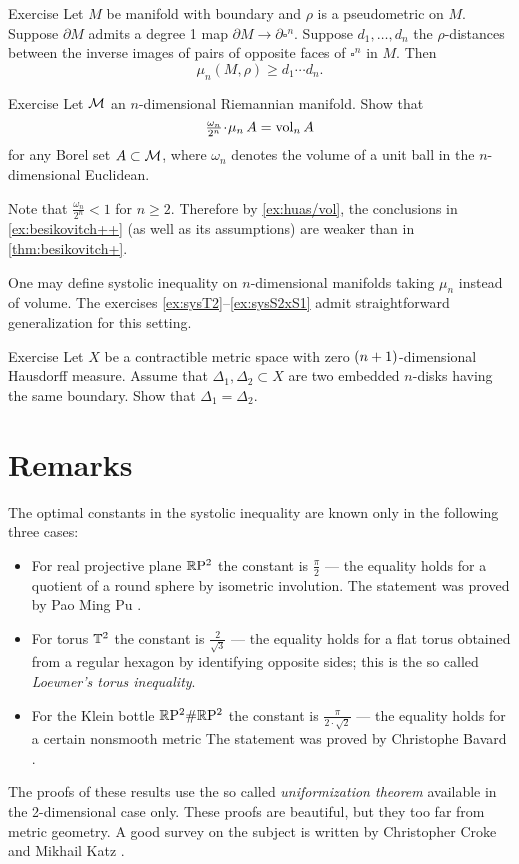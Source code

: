 \begin{thm}{Exercise}\label{ex:besikovitch++}
Let $M$ be manifold with boundary and $\rho$ is a pseudometric on $M$.
Suppose $\partial M$ admits a degree 1 map $\partial M\to\partial\square^n$. 
Suppose $d_1,\dots, d_n$ the $\rho$-distances between the inverse images of pairs of opposite faces of $\square^n$ in $M$.
Then 
\[\mu_n(M,\rho)\ge d_1\cdots d_n.\]
\end{thm}

\begin{thm}{Exercise}\label{ex:huas/vol}
Let $\mathcal{M}$ an $n$-dimensional Riemannian manifold.
Show that 
\[\tfrac{\omega_n}{2^n}\cdot\mu_n\,A=\vol_n A\]
for any Borel set $A\subset \mathcal{M}$, where $\omega_n$ denotes the volume of a unit ball in the $n$-dimensional Euclidean.
\end{thm}

Note that $\tfrac{\omega_n}{2^n}<1$ for $n\ge 2$.
Therefore by \ref{ex:huas/vol}, the conclusions in \ref{ex:besikovitch++} (as well as its assumptions) are weaker than in \ref{thm:besikovitch+}.

One may define systolic inequality on $n$-dimensional manifolds taking $\mu_n$ instead of volume. 
The exercises \ref{ex:sysT2}--\ref{ex:sysS2xS1} admit straightforward generalization for this setting.

\begin{thm}{Exercise}\label{ex:2top-discs}
Let $X$ be a contractible metric space with zero $(n\z+1)$-dimensional Hausdorff measure.
Assume that $\Delta_1,\Delta_2\subset X$ are two embedded $n$-disks having the same boundary.
Show that $\Delta_1=\Delta_2$.
\end{thm}

\section{Remarks}

The optimal constants in the systolic inequality are known only in the following three cases:
\begin{itemize}
\item For real projective plane $\mathbb{R}\mathrm{P}^2$ the constant is $\tfrac\pi2$ --- the equality holds for a quotient of a round sphere by isometric involution. The statement was proved by Pao Ming Pu \cite{pu}.\label{page:pu}
\item For torus $\mathbb{T}^2$ the constant is $\tfrac2{\sqrt{3}}$ --- the equality holds for a flat torus obtained from a regular hexagon by identifying opposite sides; this is the so called \emph{Loewner's torus inequality}.
\item For the Klein bottle $\mathbb{R}\mathrm{P}^2\#\mathbb{R}\mathrm{P}^2$  the constant is $\tfrac\pi{2\cdot\sqrt2}$ --- the equality holds for a certain nonsmooth metric The statement was proved by Christophe Bavard \cite{bavard}.
\end{itemize}
The proofs of these results use the so called {}\emph{uniformization theorem}   available in the 2-dimensional case only.
These proofs are beautiful, but they too far from metric geometry.
A good survey on the subject is written by Christopher Croke and Mikhail Katz \cite{croke-katz}.

